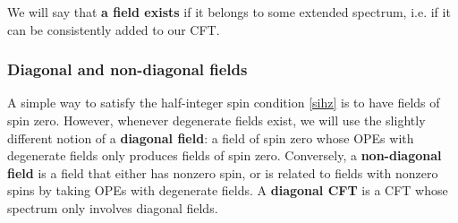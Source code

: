 \documentclass[12pt, a4paper]{article}
\newcommand{\myindex}[1]{\textbf{\boldmath #1}}
\begin{document}
We will say that \myindex{a field exists} if it belongs to some extended spectrum, i.e. if it can be consistently added to our CFT.

\subsubsection{Diagonal and non-diagonal fields}

A simple way to satisfy the half-integer spin condition \eqref{sihz} is to have fields of spin zero. However, whenever degenerate fields exist, we will use the slightly different notion of a \myindex{diagonal field}: a field of spin zero whose OPEs with degenerate fields only produces fields of spin zero. Conversely, a \myindex{non-diagonal field} is a field that either has nonzero spin, or is related to fields with nonzero spins by taking OPEs with degenerate fields. A \myindex{diagonal CFT} is a CFT whose spectrum only involves diagonal fields.
\end{document}
